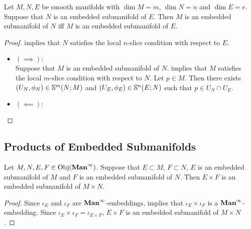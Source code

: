 \documentclass{book}
\begin{document}
	\begin{ex} 
		Let $M, N, E$ be smooth manifolds with $\dim M = m$, $\dim N = n$ and $\dim E = e$. Suppose that $N$ is an embedded submanifold of $E$. Then $M$ is an embedded submanifold of $N$ iff $M$ is an embedded submanifold of $E$.
	\end{ex}
	
	\begin{proof} implies that $N$ satisfies the local $n$-slice condition with respect to $E$.
		\begin{itemize}
			\item $(\implies):$ \\
			Suppose that $M$ is an embedded submanifold of $N$.  implies that $M$ satisfies the local $m$-slice condition with respect to $N$. Let $p \in M$. Then there exists $(U_N, \phi_N) \in \S^m(N; M)$ and $(U_E, \phi_E) \in \S^n(E;N)$ such that $p \in U_N \cap U_E$. 
			\item $(\impliedby):$ \\
			
		\end{itemize}
	\end{proof}
	
	
	
	
	
	
	
	
	
	
	
	
	
	
	
	
	
	
	
	
	
	
	
	\subsection{Products of Embedded Submanifolds}
	
	\begin{ex} 
		Let $M, N, E, F \in \Obj(\Maninf)$. Suppose that $E \subset M$, $F \subset N$, $E$ is an embedded submanifold of $M$ and $F$ is an embedded submanifold of $N$. Then $E \times F$ is an embedded submanifold of $M \times N$.
	\end{ex}

	\begin{proof}
		Since $\iota_E$ and $\iota_F$ are $\Maninf$-embeddings,  implies that $\iota_E \times \iota_F$ is a $\Maninf$-embedding. Since $\iota_E \times \iota_F = \iota_{E \times F}$, $E \times F$ is an embedded submanifold of $M \times N$.  
	\end{proof}
	
\end{document}
